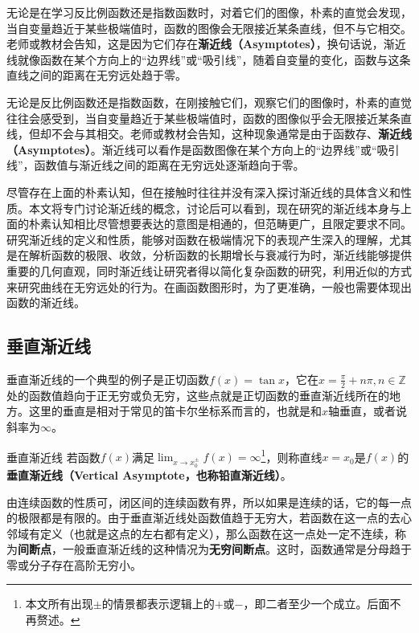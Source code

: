 
\begin{issues}
\issueDraft
\end{issues}

无论是在学习反比例函数还是指数函数时，对着它们的图像，朴素的直觉会发现，当自变量趋近于某些极端值时，函数的图像会无限接近某条直线，但不与它相交。老师或教材会告知，这是因为它们存在\textbf{渐近线（Asymptotes）}，换句话说，渐近线就像函数在某个方向上的“边界线”或“吸引线”，随着自变量的变化，函数与这条直线之间的距离在无穷远处趋于零。

无论是反比例函数还是指数函数，在刚接触它们，观察它们的图像时，朴素的直觉往往会感受到，当自变量趋近于某些极端值时，函数的图像似乎会无限接近某条直线，但却不会与其相交。老师或教材会告知，这种现象通常是由于函数存、\textbf{渐近线（Asymptotes）}。渐近线可以看作是函数图像在某个方向上的“边界线”或“吸引线”，函数值与渐近线之间的距离在无穷远处逐渐趋向于零。

尽管存在上面的朴素认知，但在接触时往往并没有深入探讨渐近线的具体含义和性质。本文将专门讨论渐近线的概念，讨论后可以看到，现在研究的渐近线本身与上面的朴素认知相比尽管想要表达的意图是相通的，但范畴更广，且限定要求不同。研究渐近线的定义和性质，能够对函数在极端情况下的表现产生深入的理解，尤其是在解析函数的极限、收敛，分析函数的长期增长与衰减行为时，渐近线能够提供重要的几何直观，同时渐近线让研究者得以简化复杂函数的研究，利用近似的方式来研究曲线在无穷远处的行为。在画函数图形时，为了更准确，一般也需要体现出函数的渐近线。

\subsection{垂直渐近线}

垂直渐近线的一个典型的例子是正切函数$f(x)=\tan x$，它在$\displaystyle x = \frac{\pi}{2} + n\pi,n \in \mathbb{Z}$处的函数值趋向于正无穷或负无穷，这些点就是正切函数的垂直渐近线所在的地方。这里的垂直是相对于常见的笛卡尔坐标系而言的，也就是和$x$轴垂直，或者说斜率为$\infty$。

\begin{definition}{垂直渐近线}
若函数$f(x)$满足$\displaystyle \lim_{x\to x_0^\pm}f(x)=\infty$\footnote{本文所有出现$\pm$的情景都表示逻辑上的$+$或$-$，即二者至少一个成立。后面不再赘述。}，则称直线$x=x_0$是$f(x)$的\textbf{垂直渐近线（Vertical Asymptote，也称铅直渐近线）}。
\end{definition}

由连续函数的性质可，闭区间的连续函数有界，所以如果是连续的话，它的每一点的极限都是有限的。由于垂直渐近线处函数值趋于无穷大，若函数在这一点的去心邻域有定义（也就是这点的左右都有定义），那么函数在这一点处一定不连续，称为\textbf{间断点}，一般垂直渐近线的这种情况为\textbf{无穷间断点}。这时，函数通常是分母趋于零或分子存在高阶无穷小。


